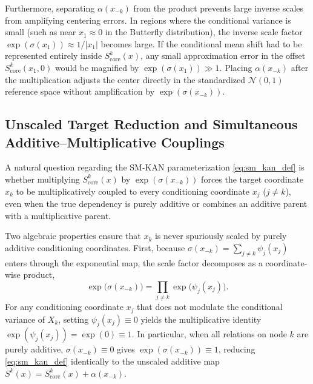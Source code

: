 \documentclass[11pt,a4paper]{article}
\theoremstyle{plain}
\theoremstyle{definition}
\theoremstyle{remark}
\begin{document}
Furthermore, separating $\alpha(x_{-k})$ from the product prevents large inverse scales from amplifying centering errors. In regions where the conditional variance is small (such as near $x_1 \approx 0$ in the Butterfly distribution), the inverse scale factor $\exp(\sigma(x_1)) \approx 1/|x_1|$ becomes large. If the conditional mean shift had to be represented entirely inside $S^k_{\text{core}}(x)$, any small approximation error in the offset $S^k_{\text{core}}(x_1, 0)$ would be magnified by $\exp(\sigma(x_1)) \gg 1$. Placing $\alpha(x_{-k})$ after the multiplication adjusts the center directly in the standardized $\mathcal{N}(0, 1)$ reference space without amplification by $\exp(\sigma(x_{-k}))$.

\subsection{Unscaled Target Reduction and Simultaneous Additive--Multiplicative Couplings}
A natural question regarding the SM-KAN parameterization \eqref{eq:sm_kan_def} is whether multiplying $S^k_{\text{core}}(x)$ by $\exp(\sigma(x_{-k}))$ forces the target coordinate $x_k$ to be multiplicatively coupled to every conditioning coordinate $x_j$ ($j \neq k$), even when the true dependency is purely additive or combines an additive parent with a multiplicative parent.

Two algebraic properties ensure that $x_k$ is never spuriously scaled by purely additive conditioning coordinates. First, because $\sigma(x_{-k}) = \sum_{j \neq k} \psi_j(x_j)$ enters through the exponential map, the scale factor decomposes as a coordinate-wise product,
\begin{equation}
    \exp\big(\sigma(x_{-k})\big) = \prod_{j \neq k} \exp\big(\psi_j(x_j)\big).
\end{equation}
For any conditioning coordinate $x_j$ that does not modulate the conditional variance of $X_k$, setting $\psi_j(x_j) \equiv 0$ yields the multiplicative identity $\exp(\psi_j(x_j)) = \exp(0) \equiv 1$. In particular, when all relations on node $k$ are purely additive, $\sigma(x_{-k}) \equiv 0$ gives $\exp(\sigma(x_{-k})) \equiv 1$, reducing \eqref{eq:sm_kan_def} identically to the unscaled additive map $S^k(x) = S^k_{\text{core}}(x) + \alpha(x_{-k})$.
\end{document}
